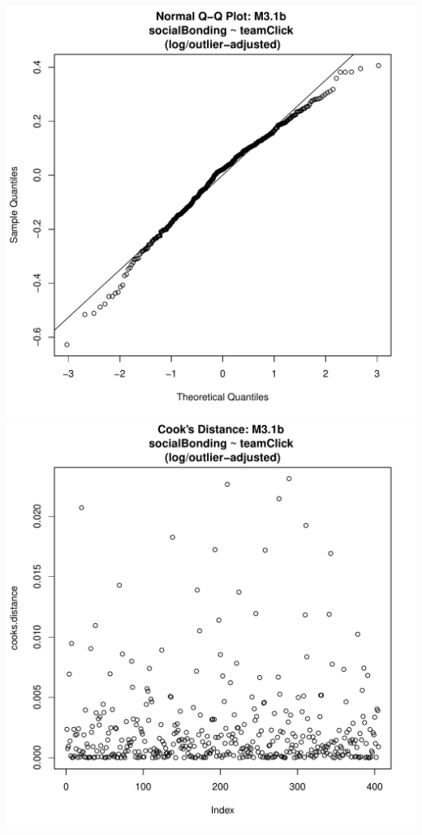 \documentclass[12pt]{report}
\begin{document}
\includegraphics[scale =.4]{../images/MLM31bOutLogQQNorm.pdf}
\includegraphics[scale =.4]{../images/MLM31bOutLogCooksD.pdf}


\newpage
\end{document}
